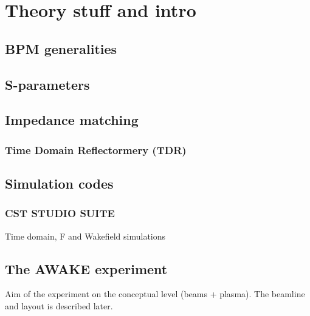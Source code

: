 \chapter{Theory stuff and intro}

\section[BPM generalities]{BPM generalities}

\section[S-parameters]{S-parameters}

\section[Impedance matching]{Impedance matching}

\subsection[Time Domain Reflectormery (TDR)]{Time Domain Reflectormery (TDR)}


\section[Simulation codes]{Simulation codes}

\subsection[CST STUDIO SUITE\textregistered]{CST STUDIO SUITE\textregistered}

Time domain, F and Wakefield simulations

\section[The AWAKE experiment]{The AWAKE experiment}

Aim of the experiment on the conceptual level (beams + plasma). The beamline and layout is described later.
